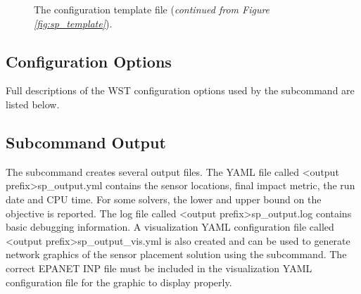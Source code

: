 \begin{figure}[h!]
	\caption[The  configuration template file (ctd.)]{The  configuration template file (\textit{continued from Figure \ref{fig:sp_template}}).}
	\label{fig:sp_template_ctd}
\end{figure}

\clearpage
\subsection{Configuration Options}

Full descriptions of the WST configuration options used by the  subcommand are listed below.


\subsection{Subcommand Output}

The  subcommand creates several output files.
The YAML file called <output prefix>sp\_output.yml contains the sensor locations,
final impact metric, the run date and CPU time. For some solvers, the
lower and upper bound on the objective is reported.   
The log file called <output prefix>sp\_output.log contains basic debugging information. 
A visualization YAML configuration file called
<output prefix>sp\_output\_vis.yml is also created and can be used to generate 
network graphics of the sensor placement solution using the  
subcommand. The correct EPANET INP file must be included in the visualization YAML configuration 
file for the graphic to display properly.

